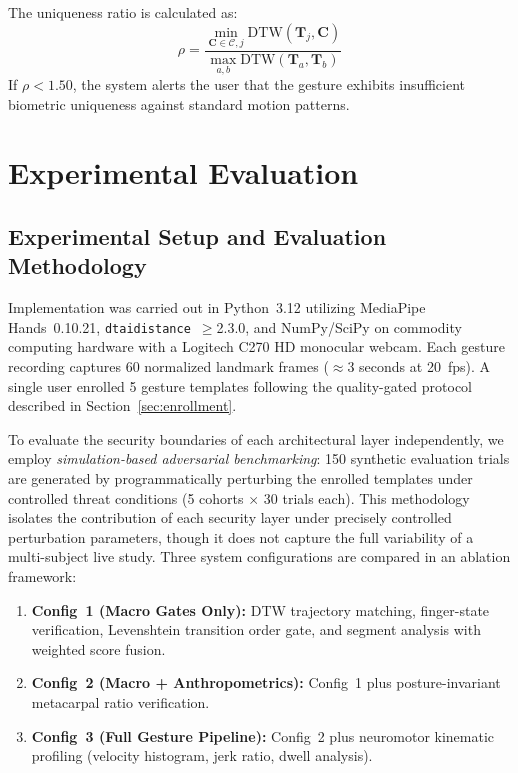 \documentclass[conference]{IEEEtran}
\begin{document}
The uniqueness ratio is calculated as:
\begin{equation}
\rho = \frac{\min_{\mathbf{C} \in \mathcal{C}, j} \text{DTW}(\mathbf{T}_j, \mathbf{C})}{\max_{a, b} \text{DTW}(\mathbf{T}_a, \mathbf{T}_b)}
\end{equation}
If $\rho < 1.50$, the system alerts the user that the gesture exhibits insufficient biometric uniqueness against standard motion patterns.

\section{Experimental Evaluation}
\label{sec:experiments}

\subsection{Experimental Setup and Evaluation Methodology}
Implementation was carried out in Python~3.12 utilizing MediaPipe Hands~0.10.21, \texttt{dtaidistance}~$\ge$2.3.0, and NumPy/SciPy on commodity computing hardware with a Logitech C270 HD monocular webcam. Each gesture recording captures 60 normalized landmark frames ($\approx$3 seconds at 20~fps). A single user enrolled 5 gesture templates following the quality-gated protocol described in Section~\ref{sec:enrollment}.

To evaluate the security boundaries of each architectural layer independently, we employ \textit{simulation-based adversarial benchmarking}: 150 synthetic evaluation trials are generated by programmatically perturbing the enrolled templates under controlled threat conditions (5 cohorts $\times$ 30 trials each). This methodology isolates the contribution of each security layer under precisely controlled perturbation parameters, though it does not capture the full variability of a multi-subject live study. Three system configurations are compared in an ablation framework:
\begin{enumerate}
\item \textbf{Config~1 (Macro Gates Only):} DTW trajectory matching, finger-state verification, Levenshtein transition order gate, and segment analysis with weighted score fusion.
\item \textbf{Config~2 (Macro + Anthropometrics):} Config~1 plus posture-invariant metacarpal ratio verification.
\item \textbf{Config~3 (Full Gesture Pipeline):} Config~2 plus neuromotor kinematic profiling (velocity histogram, jerk ratio, dwell analysis).
\end{enumerate}
\end{document}
